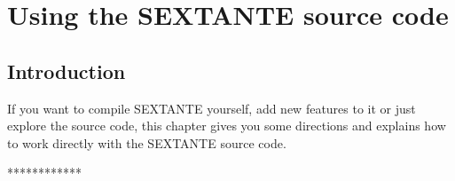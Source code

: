 \chapter{Using the SEXTANTE source code}

\section{Introduction}

If you want to compile SEXTANTE yourself, add new features to it or just explore the source code, this chapter gives you some directions and explains how to work directly with the SEXTANTE source code.

************